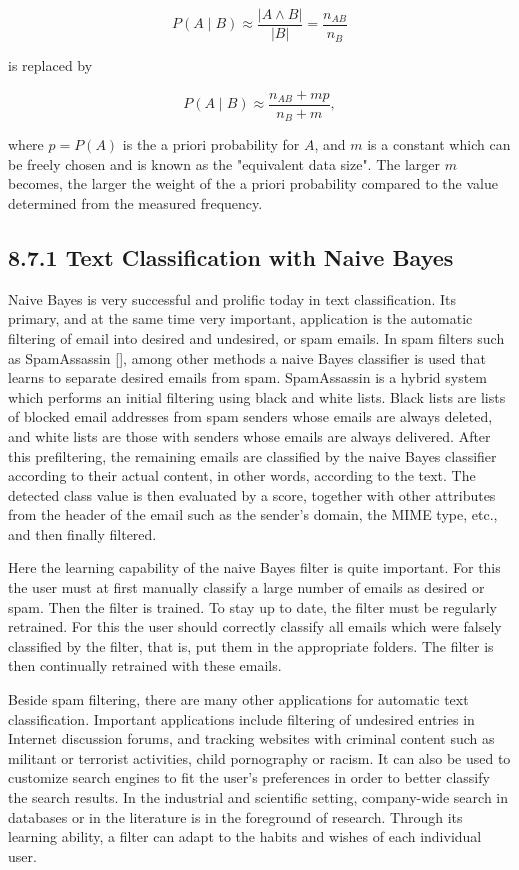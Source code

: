 \documentclass[10pt]{article}
\begin{document}
$$
P(A \mid B) \approx \frac{|A \wedge B|}{|B|}=\frac{n_{A B}}{n_{B}}
$$

is replaced by

$$
P(A \mid B) \approx \frac{n_{A B}+m p}{n_{B}+m},
$$

where $p=P(A)$ is the a priori probability for $A$, and $m$ is a constant which can be freely chosen and is known as the "equivalent data size". The larger $m$ becomes, the larger the weight of the a priori probability compared to the value determined from the measured frequency.

\subsection*{8.7.1 Text Classification with Naive Bayes}
Naive Bayes is very successful and prolific today in text classification. Its primary, and at the same time very important, application is the automatic filtering of email into desired and undesired, or spam emails. In spam filters such as SpamAssassin [\cite{schwartz2004spamassassin}], among other methods a naive Bayes classifier is used that learns to separate desired emails from spam. SpamAssassin is a hybrid system which performs an initial filtering using black and white lists. Black lists are lists of blocked email addresses from spam senders whose emails are always deleted, and white lists are those with senders whose emails are always delivered. After this prefiltering, the remaining emails are classified by the naive Bayes classifier according to their actual content, in other words, according to the text. The detected class value is then evaluated by a score, together with other attributes from the header of the email such as the sender's domain, the MIME type, etc., and then finally filtered.

Here the learning capability of the naive Bayes filter is quite important. For this the user must at first manually classify a large number of emails as desired or spam. Then the filter is trained. To stay up to date, the filter must be regularly retrained. For this the user should correctly classify all emails which were falsely classified by the filter, that is, put them in the appropriate folders. The filter is then continually retrained with these emails.


Beside spam filtering, there are many other applications for automatic text classification. Important applications include filtering of undesired entries in Internet discussion forums, and tracking websites with criminal content such as militant or terrorist activities, child pornography or racism. It can also be used to customize search engines to fit the user's preferences in order to better classify the search results. In the industrial and scientific setting, company-wide search in databases or in the literature is in the foreground of research. Through its learning ability, a filter can adapt to the habits and wishes of each individual user.
\end{document}
